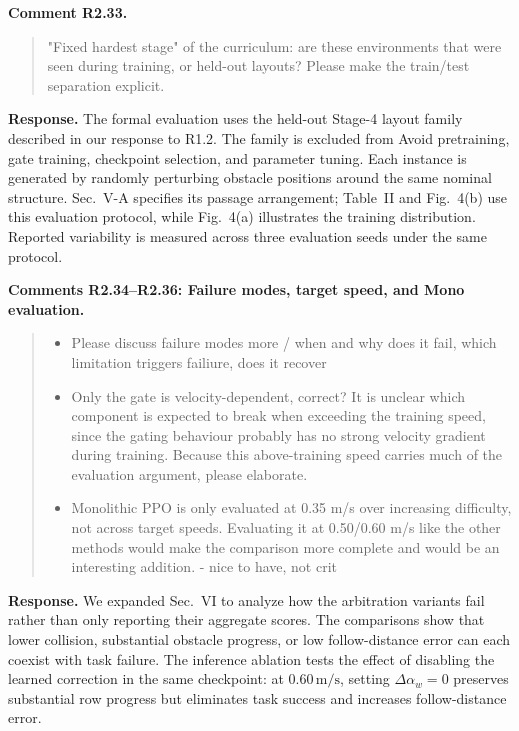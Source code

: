 \documentclass[letterpaper,11pt]{article}
\begin{document}
\noindent\textbf{Comment R2.33.}
\begin{quote}\color{reviewgray}
"Fixed hardest stage" of the curriculum: are these environments that were seen during training, or held-out layouts? Please make the train/test separation explicit.
\end{quote}
\noindent\textbf{Response.}
The formal evaluation uses the held-out Stage-4 layout family described in our response to R1.2. The family is excluded from Avoid pretraining, gate training, checkpoint selection, and parameter tuning. Each instance is generated by randomly perturbing obstacle positions around the same nominal structure. Sec.~V-A specifies its passage arrangement; Table~II and Fig.~4(b) use this evaluation protocol, while Fig.~4(a) illustrates the training distribution. Reported variability is measured across three evaluation seeds under the same protocol.
\par\nopagebreak[4]


\noindent\textbf{Comments R2.34--R2.36: Failure modes, target speed, and Mono evaluation.}
\begin{quote}\color{reviewgray}
\begin{itemize}[leftmargin=*,nosep,label={}]
\item[\textbf{R2.34.}] Please discuss failure modes more / when and why does it fail, which limitation triggers failiure, does it recover
\item[\textbf{R2.35.}] Only the gate is velocity-dependent, correct? It is unclear which component is expected to break when exceeding the training speed, since the gating behaviour probably has no strong velocity gradient during training. Because this above-training speed carries much of the evaluation argument, please elaborate.
\item[\textbf{R2.36.}] Monolithic PPO is only evaluated at 0.35 m/s over increasing difficulty, not across target speeds. Evaluating it at 0.50/0.60 m/s like the other methods would make the comparison more complete and would be an interesting addition. - nice to have, not crit
\end{itemize}
\end{quote}
\noindent\textbf{Response.}
We expanded Sec.~VI to analyze how the arbitration variants fail rather than only reporting their aggregate scores. The comparisons show that lower collision, substantial obstacle progress, or low follow-distance error can each coexist with task failure. The inference ablation tests the effect of disabling the learned correction in the same checkpoint: at $0.60\,\mathrm{m/s}$, setting $\Delta\alpha_w=0$ preserves substantial row progress but eliminates task success and increases follow-distance error.
\end{document}
